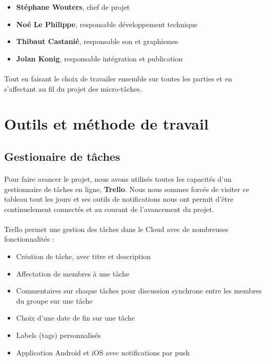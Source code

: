 \begin{itemize}
\item \textbf{Stéphane Wouters}, chef de projet
\item \textbf{Noé Le Philippe}, responsable développement technique
\item \textbf{Thibaut Castanié}, responsable son et graphismes
\item \textbf{Jolan Konig}, responsable intégration et publication
\end{itemize}

\paragraph{}
Tout en faisant le choix de travailer ensemble sur toutes les parties et en s’affectant au fil du projet des micro-tâches.

\section{Outils et méthode de travail}

\subsection{Gestionaire de tâches}

\paragraph{}
Pour faire avancer le projet, nous avons utilisés toutes les capacités d’un gestionnaire de tâches en ligne, \textbf{Trello}. Nous nous sommes forcés de visiter ce tableau tout les jours et ses outils de notifications nous ont permit d’être continuelement connectés et au courant de l’avancement du projet.

\paragraph{}
Trello permet une gestion des tâches dans le Cloud avec de nombreuses fonctionnalités :
\begin{itemize}
\item Création de tâche, avec titre et description
\item Affectation de membres à une tâche
\item Commentaires sur chaque tâches pour discussion synchrone entre les membres du groupe sur une tâche
\item Choix d’une date de fin sur une tâche
\item Labels (tags) personnalisés
\item Application Android et iOS avec notifications par push
\end{itemize}

